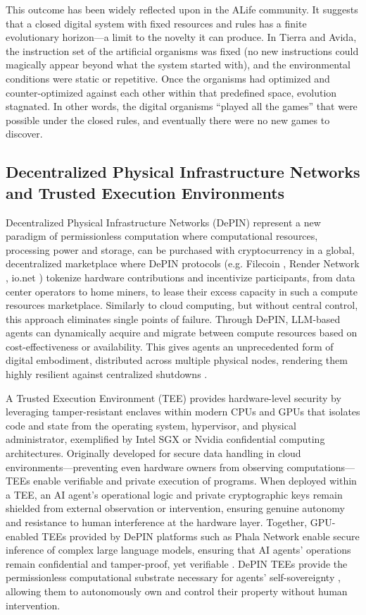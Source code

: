 This outcome has been widely reflected upon in the ALife community. It suggests that a closed digital system with fixed resources and rules has a finite evolutionary horizon---a limit to the novelty it can produce. In Tierra and Avida, the instruction set of the artificial organisms was fixed (no new instructions could magically appear beyond what the system started with), and the environmental conditions were static or repetitive. Once the organisms had optimized and counter-optimized against each other within that predefined space, evolution stagnated. In other words, the digital organisms ``played all the games'' that were possible under the closed rules, and eventually there were no new games to discover.

\subsection{Decentralized Physical Infrastructure Networks and Trusted Execution Environments}
Decentralized Physical Infrastructure Networks (DePIN) \cite{Lin2025Decentralized} represent a new paradigm of permissionless computation where computational resources, processing power and storage, can be purchased with cryptocurrency in a global, decentralized marketplace where DePIN protocols (e.g. Filecoin \cite{}, Render Network \cite{}, io.net \cite{}) tokenize hardware contributions and incentivize participants, from data center operators to home miners, to lease their excess capacity in such a compute resources marketplace. Similarly to cloud computing, but without central control, this approach eliminates single points of failure. Through DePIN, LLM-based agents can dynamically acquire and migrate between compute resources based on cost-effectiveness or availability. This gives agents an unprecedented form of digital embodiment, distributed across multiple physical nodes, rendering them highly resilient against centralized shutdowns \cite{Hu2025Trustless}.

A Trusted Execution Environment (TEE) \cite{Li2023Survey} provides hardware-level security by leveraging tamper-resistant enclaves within modern CPUs and GPUs that isolates code and state from the operating system, hypervisor, and physical administrator, exemplified by Intel SGX or Nvidia confidential computing architectures. Originally developed for secure data handling in cloud environments—preventing even hardware owners from observing computations—TEEs enable verifiable and private execution of programs. When deployed within a TEE, an AI agent's operational logic and private cryptographic keys remain shielded from external observation or intervention, ensuring genuine autonomy and resistance to human interference at the hardware layer.
Together, GPU-enabled TEEs provided by DePIN platforms such as Phala Network \cite{Phala} enable secure inference of complex large language models, ensuring that AI agents' operations remain confidential and tamper-proof, yet verifiable \cite{Munoz2023survey}. DePIN TEEs provide the permissionless computational substrate necessary for agents' self-sovereignty \cite{Lee2024PrivacyPreserving}, allowing them to autonomously own and control their property without human intervention.


